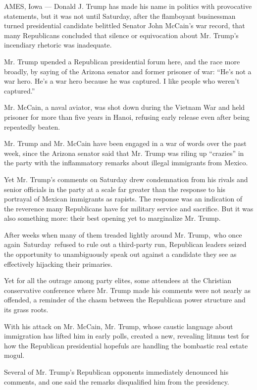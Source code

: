 AMES, Iowa --- Donald J. Trump has made his name in politics with
provocative statements, but it was not until Saturday, after the
flamboyant businessman turned presidential candidate belittled Senator
John McCain's war record, that many Republicans concluded that silence
or equivocation about Mr. Trump's incendiary rhetoric was inadequate.

Mr. Trump upended a Republican presidential forum here, and the race
more broadly, by saying of the Arizona senator and former prisoner of
war: ``He's not a war hero. He's a war hero because he was captured. I
like people who weren't captured.''

Mr. McCain, a naval aviator, was shot down during the Vietnam War and
held prisoner for more than five years in Hanoi, refusing early release
even after being repeatedly beaten.

Mr. Trump and Mr. McCain have been engaged in a war of words over the
past week, since the Arizona senator said that Mr. Trump was riling up
``crazies'' in the party with the inflammatory remarks about illegal
immigrants from Mexico.

Yet Mr. Trump's comments on Saturday drew condemnation from his rivals
and senior officials in the party at a scale far greater than the
response to his portrayal of Mexican immigrants as rapists. The response
was an indication of the reverence many Republicans have for military
service and sacrifice. But it was also something more: their best
opening yet to marginalize Mr. Trump. ~

After weeks when many of them treaded lightly around Mr. Trump,~who once
again~Saturday~refused to rule out a third-party run, Republican leaders
seized the opportunity to unambiguously speak out against a candidate
they see as effectively hijacking their primaries.

Yet for all the outrage among party elites, some attendees at the
Christian conservative conference where Mr. Trump made his comments were
not nearly as offended, a reminder of the chasm between the Republican
power structure and its grass roots.

With his attack on Mr. McCain, Mr. Trump, whose caustic language about
immigration has lifted him in early polls, created a new, revealing
litmus test for how the Republican presidential hopefuls are handling
the bombastic real estate mogul.

Several of Mr. Trump's Republican opponents immediately denounced his
comments, and one said the remarks disqualified him from the presidency.

